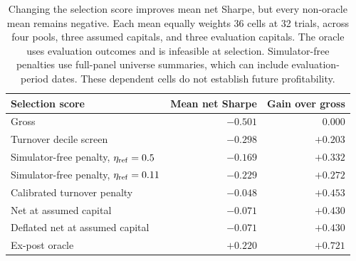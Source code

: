 \begin{table}[htbp]
\centering
\caption{Changing the selection score improves mean net Sharpe, but every non-oracle mean remains negative. Each mean equally weights 36 cells at 32 trials, across four pools, three assumed capitals, and three evaluation capitals. The oracle uses evaluation outcomes and is infeasible at selection. Simulator-free penalties use full-panel universe summaries, which can include evaluation-period dates. These dependent cells do not establish future profitability.}
\label{tab:remedy}
\begin{tabular}{lrr}
\toprule
Selection score & Mean net Sharpe & Gain over gross\\
\midrule
Gross & $-0.501$ & $0.000$\\
Turnover decile screen & $-0.298$ & $+0.203$\\
Simulator-free penalty, $\eta_{\rm ref}=0.5$ & $-0.169$ & $+0.332$\\
Simulator-free penalty, $\eta_{\rm ref}=0.11$ & $-0.229$ & $+0.272$\\
Calibrated turnover penalty & $-0.048$ & $+0.453$\\
Net at assumed capital & $-0.071$ & $+0.430$\\
Deflated net at assumed capital & $-0.071$ & $+0.430$\\
Ex-post oracle & $+0.220$ & $+0.721$\\
\bottomrule
\end{tabular}

\end{table}
